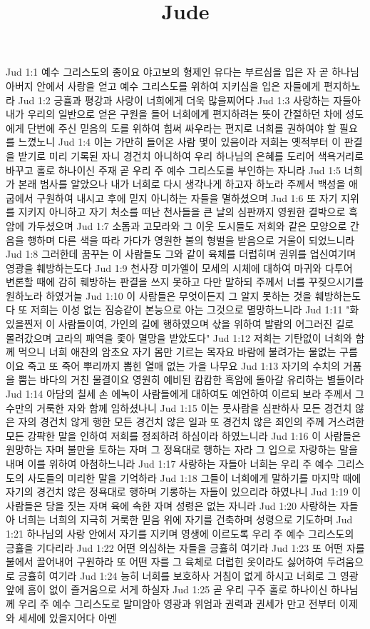 

\title{Jude}

Jud 1:1  예수 그리스도의 종이요 야고보의 형제인 유다는 부르심을 입은 자 곧 하나님 아버지 안에서 사랑을 얻고 예수 그리스도를 위하여 지키심을 입은 자들에게 편지하노라
Jud 1:2  긍휼과 평강과 사랑이 너희에게 더욱 많을찌어다
Jud 1:3  사랑하는 자들아 내가 우리의 일반으로 얻은 구원을 들어 너희에게 편지하려는 뜻이 간절하던 차에 성도에게 단번에 주신 믿음의 도를 위하여 힘써 싸우라는 편지로 너희를 권하여야 할 필요를 느꼈노니
Jud 1:4  이는 가만히 들어온 사람 몇이 있음이라 저희는 옛적부터 이 판결을 받기로 미리 기록된 자니 경건치 아니하여 우리 하나님의 은혜를 도리어 색욕거리로 바꾸고 홀로 하나이신 주재 곧 우리 주 예수 그리스도를 부인하는 자니라
Jud 1:5  너희가 본래 범사를 알았으나 내가 너희로 다시 생각나게 하고자 하노라 주께서 백성을 애굽에서 구원하여 내시고 후에 믿지 아니하는 자들을 멸하셨으며
Jud 1:6  또 자기 지위를 지키지 아니하고 자기 처소를 떠난 천사들을 큰 날의 심판까지 영원한 결박으로 흑암에 가두셨으며
Jud 1:7  소돔과 고모라와 그 이웃 도시들도 저희와 같은 모양으로 간음을 행하며 다른 색을 따라 가다가 영원한 불의 형벌을 받음으로 거울이 되었느니라
Jud 1:8  그러한데 꿈꾸는 이 사람들도 그와 같이 육체를 더럽히며 권위를 업신여기며 영광을 훼방하는도다
Jud 1:9  천사장 미가엘이 모세의 시체에 대하여 마귀와 다투어 변론할 때에 감히 훼방하는 판결을 쓰지 못하고 다만 말하되 주께서 너를 꾸짖으시기를 원하노라 하였거늘
Jud 1:10  이 사람들은 무엇이든지 그 알지 못하는 것을 훼방하는도다 또 저희는 이성 없는 짐승같이 본능으로 아는 그것으로 멸망하느니라
Jud 1:11  "화 있을찐저 이 사람들이여, 가인의 길에 행하였으며 삯을 위하여 발람의 어그러진 길로 몰려갔으며 고라의 패역을 좇아 멸망을 받았도다"
Jud 1:12  저희는 기탄없이 너희와 함께 먹으니 너희 애찬의 암초요 자기 몸만 기르는 목자요 바람에 불려가는 물없는 구름이요 죽고 또 죽어 뿌리까지 뽑힌 열매 없는 가을 나무요
Jud 1:13  자기의 수치의 거품을 뿜는 바다의 거친 물결이요 영원히 예비된 캄캄한 흑암에 돌아갈 유리하는 별들이라
Jud 1:14  아담의 칠세 손 에녹이 사람들에게 대하여도 예언하여 이르되 보라 주께서 그 수만의 거룩한 자와 함께 임하셨나니
Jud 1:15  이는 뭇사람을 심판하사 모든 경건치 않은 자의 경건치 않게 행한 모든 경건치 않은 일과 또 경건치 않은 죄인의 주께 거스려한 모든 강퍅한 말을 인하여 저희를 정죄하려 하심이라 하였느니라
Jud 1:16  이 사람들은 원망하는 자며 불만을 토하는 자며 그 정욕대로 행하는 자라 그 입으로 자랑하는 말을 내며 이를 위하여 아첨하느니라
Jud 1:17  사랑하는 자들아 너희는 우리 주 예수 그리스도의 사도들의 미리한 말을 기억하라
Jud 1:18  그들이 너희에게 말하기를 마지막 때에 자기의 경건치 않은 정욕대로 행하며 기롱하는 자들이 있으리라 하였나니
Jud 1:19  이 사람들은 당을 짓는 자며 육에 속한 자며 성령은 없는 자니라
Jud 1:20  사랑하는 자들아 너희는 너희의 지극히 거룩한 믿음 위에 자기를 건축하며 성령으로 기도하며
Jud 1:21  하나님의 사랑 안에서 자기를 지키며 영생에 이르도록 우리 주 예수 그리스도의 긍휼을 기다리라
Jud 1:22  어떤 의심하는 자들을 긍휼히 여기라
Jud 1:23  또 어떤 자를 불에서 끌어내어 구원하라 또 어떤 자를 그 육체로 더럽힌 옷이라도 싫어하여 두려움으로 긍휼히 여기라
Jud 1:24  능히 너희를 보호하사 거침이 없게 하시고 너희로 그 영광 앞에 흠이 없이 즐거움으로 서게 하실자
Jud 1:25  곧 우리 구주 홀로 하나이신 하나님께 우리 주 예수 그리스도로 말미암아 영광과 위엄과 권력과 권세가 만고 전부터 이제와 세세에 있을지어다 아멘


